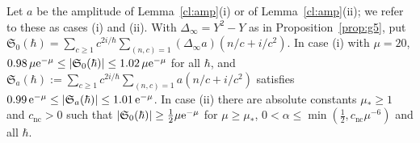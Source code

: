 \begin{lemma}\label{cl:noncancel}
Let $a$ be the amplitude of Lemma~\ref{cl:amp}(i) or of Lemma~\ref{cl:amp}(ii); we refer to these as cases (i) and (ii).
With $\Delta_\infty=Y^2-Y$ as in Proposition~\ref{prop:g5}, put $\mathfrak S_0(\hbar)=\sum_{c\ge1}c^{2i/\hbar}\sum_{(n,c)=1}(\Delta_\infty a)(n/c+i/c^2)$. In case
(i) with $\mu=20$, $0.98\,\mu\mathrm{e}^{-\mu}\le|\mathfrak S_0(\hbar)|\le1.02\,\mu\mathrm{e}^{-\mu}$ for all $\hbar$, and
$\mathfrak S_a(\hbar):=\sum_{c\ge1}c^{2i/\hbar}\sum_{(n,c)=1}a(n/c+i/c^2)$ satisfies $0.99\,\mathrm{e}^{-\mu}\le|\mathfrak S_a(\hbar)|\le1.01\,\mathrm{e}^{-\mu}$. In case (ii) there are absolute constants $\mu_*\ge1$ and $c_{\mathrm{nc}}>0$ such that $|\mathfrak S_0(\hbar)|\ge\tfrac12\mu\mathrm{e}^{-\mu}$ for
$\mu\ge\mu_*$, $0<\alpha\le\min(\tfrac12,c_{\mathrm{nc}}\mu^{-6})$ and all $\hbar$.
\end{lemma}
